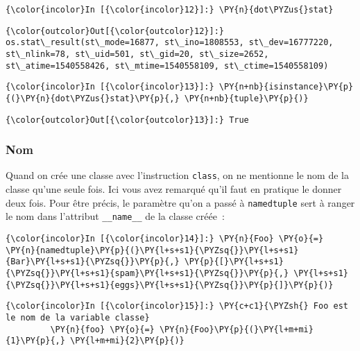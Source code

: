    \begin{Verbatim}[commandchars=\\\{\}]
{\color{incolor}In [{\color{incolor}12}]:} \PY{n}{dot\PYZus{}stat}
\end{Verbatim}


\begin{Verbatim}[commandchars=\\\{\}]
{\color{outcolor}Out[{\color{outcolor}12}]:} os.stat\_result(st\_mode=16877, st\_ino=1808553, st\_dev=16777220, st\_nlink=78, st\_uid=501, st\_gid=20, st\_size=2652, st\_atime=1540558426, st\_mtime=1540558109, st\_ctime=1540558109)
\end{Verbatim}
            
    \begin{Verbatim}[commandchars=\\\{\}]
{\color{incolor}In [{\color{incolor}13}]:} \PY{n+nb}{isinstance}\PY{p}{(}\PY{n}{dot\PYZus{}stat}\PY{p}{,} \PY{n+nb}{tuple}\PY{p}{)}
\end{Verbatim}


\begin{Verbatim}[commandchars=\\\{\}]
{\color{outcolor}Out[{\color{outcolor}13}]:} True
\end{Verbatim}
            
    \hypertarget{nom}{%
\subsubsection{Nom}\label{nom}}

    Quand on crée une classe avec l'instruction \texttt{class}, on ne
mentionne le nom de la classe qu'une seule fois. Ici vous avez remarqué
qu'il faut en pratique le donner deux fois. Pour être précis, le
paramètre qu'on a passé à \texttt{namedtuple} sert à ranger le nom dans
l'attribut \texttt{\_\_name\_\_} de la classe créée~:

    \begin{Verbatim}[commandchars=\\\{\}]
{\color{incolor}In [{\color{incolor}14}]:} \PY{n}{Foo} \PY{o}{=} \PY{n}{namedtuple}\PY{p}{(}\PY{l+s+s1}{\PYZsq{}}\PY{l+s+s1}{Bar}\PY{l+s+s1}{\PYZsq{}}\PY{p}{,} \PY{p}{[}\PY{l+s+s1}{\PYZsq{}}\PY{l+s+s1}{spam}\PY{l+s+s1}{\PYZsq{}}\PY{p}{,} \PY{l+s+s1}{\PYZsq{}}\PY{l+s+s1}{eggs}\PY{l+s+s1}{\PYZsq{}}\PY{p}{]}\PY{p}{)}
\end{Verbatim}


    \begin{Verbatim}[commandchars=\\\{\}]
{\color{incolor}In [{\color{incolor}15}]:} \PY{c+c1}{\PYZsh{} Foo est le nom de la variable classe}
         \PY{n}{foo} \PY{o}{=} \PY{n}{Foo}\PY{p}{(}\PY{l+m+mi}{1}\PY{p}{,} \PY{l+m+mi}{2}\PY{p}{)}
\end{Verbatim}



